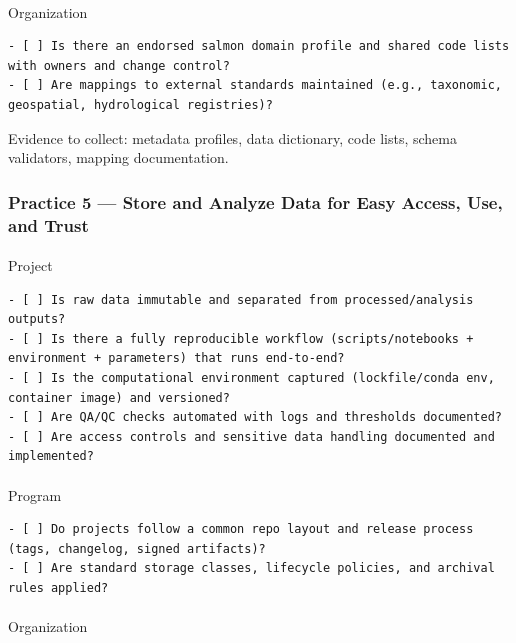 \documentclass[
  letterpaper,
  DIV=11,
  numbers=noendperiod]{scrartcl}
\makeatletter
\let\oldparagraph\paragraph
\renewcommand{\paragraph}{
    \@ifstar
      \xxxParagraphStar
      \xxxParagraphNoStar
  }
\newcommand{\xxxParagraphStar}[1]{\oldparagraph*{#1}\mbox{}}
\newcommand{\xxxParagraphNoStar}[1]{\oldparagraph{#1}\mbox{}}
\makeatother
\begin{document}
\paragraph{Organization}\label{organization-3}

\begin{verbatim}
- [ ] Is there an endorsed salmon domain profile and shared code lists with owners and change control?
- [ ] Are mappings to external standards maintained (e.g., taxonomic, geospatial, hydrological registries)?
\end{verbatim}

Evidence to collect: metadata profiles, data dictionary, code lists,
schema validators, mapping documentation.

\subsubsection{Practice 5 --- Store and Analyze Data for Easy Access,
Use, and
Trust}\label{practice-5-store-and-analyze-data-for-easy-access-use-and-trust}

\paragraph{Project}\label{project-4}

\begin{verbatim}
- [ ] Is raw data immutable and separated from processed/analysis outputs?
- [ ] Is there a fully reproducible workflow (scripts/notebooks + environment + parameters) that runs end‑to‑end?
- [ ] Is the computational environment captured (lockfile/conda env, container image) and versioned?
- [ ] Are QA/QC checks automated with logs and thresholds documented?
- [ ] Are access controls and sensitive data handling documented and implemented?
\end{verbatim}

\paragraph{Program}\label{program-4}

\begin{verbatim}
- [ ] Do projects follow a common repo layout and release process (tags, changelog, signed artifacts)?
- [ ] Are standard storage classes, lifecycle policies, and archival rules applied?
\end{verbatim}

\paragraph{Organization}\label{organization-4}
\end{document}
